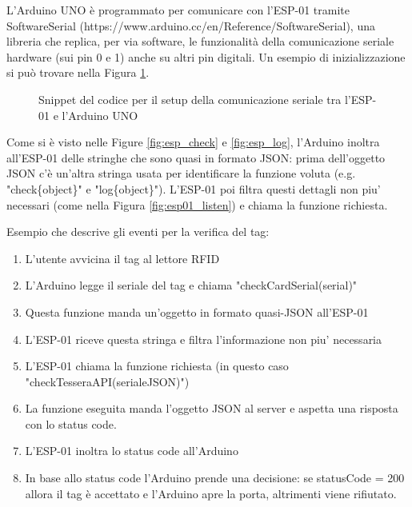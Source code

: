 \documentclass[12pt]{report}
\begin{document}
L'Arduino UNO è programmato per comunicare con l'ESP-01 tramite SoftwareSerial (https://www.arduino.cc/en/Reference/SoftwareSerial), una libreria che replica, per via software, le funzionalità della comunicazione seriale hardware (sui pin 0 e 1) anche su altri pin digitali. Un esempio di inizializzazione si può trovare nella Figura \ref{fig:arduino_esp_serial_setup}.


\begin{figure}
	\caption{Snippet del codice per il setup della comunicazione seriale tra l'ESP-01 e l'Arduino UNO}
	\label{fig:arduino_esp_serial_setup}
\end{figure}

Come si è visto nelle Figure \ref{fig:esp_check} e \ref{fig:esp_log}, l'Arduino inoltra all'ESP-01 delle stringhe che sono quasi in formato JSON: prima dell'oggetto JSON c'è un'altra stringa usata per identificare la funzione voluta (e.g. "check\{object\}" e "log\{object\}"). L'ESP-01 poi filtra questi dettagli non piu' necessari (come nella Figura \ref{fig:esp01_listen}) e chiama la funzione richiesta.

Esempio che descrive gli eventi per la verifica del tag:

\begin{enumerate}
	\item L'utente avvicina il tag al lettore RFID
	\item L'Arduino legge il seriale del tag e chiama "checkCardSerial(serial)"
	\item Questa funzione manda un'oggetto in formato quasi-JSON all'ESP-01
	\item L'ESP-01 riceve questa stringa e filtra l'informazione non piu' necessaria
	\item L'ESP-01 chiama la funzione richiesta (in questo caso "checkTesseraAPI(serialeJSON)")
	\item La funzione eseguita manda l'oggetto JSON al server e aspetta una risposta con lo status code.
	\item L'ESP-01 inoltra lo status code all'Arduino
	\item In base allo status code l'Arduino prende una decisione: se statusCode = 200 allora il tag è accettato e l'Arduino apre la porta, altrimenti viene rifiutato.
\end{enumerate}
\end{document}
